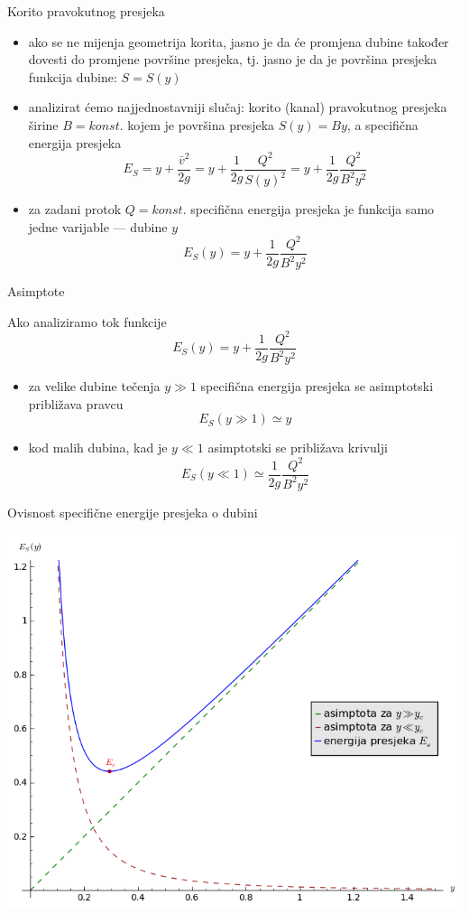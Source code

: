 \documentclass{beamer}
\begin{document}
\begin{frame}{Korito pravokutnog presjeka}

\begin{itemize}
\item ako se ne mijenja geometrija korita, jasno je da će promjena dubine
također dovesti do promjene površine presjeka, tj. jasno je da je
površina presjeka funkcija dubine: $S=S(y)$
\item analizirat ćemo najjednostavniji slučaj: korito (kanal) pravokutnog
presjeka širine $B=konst.$ kojem je površina presjeka $S(y)=By$,
a specifična energija presjeka
\[
E_{S}=y+\frac{\bar{v}^{2}}{2g}=y+\frac{1}{2g}\frac{Q^{2}}{S(y)^{2}}=y+\frac{1}{2g}\frac{Q^{2}}{B^{2}y^{2}}
\]
\item za zadani protok $Q=konst.$ specifična energija presjeka je funkcija
samo jedne varijable --- dubine $y$
\[
E_{S}(y)=y+\frac{1}{2g}\frac{Q^{2}}{B^{2}y^{2}}
\]
\end{itemize}
\end{frame}

\begin{frame}{Asimptote}

Ako analiziramo tok funkcije
\[
E_{S}(y)=y+\frac{1}{2g}\frac{Q^{2}}{B^{2}y^{2}}
\]

\begin{itemize}
\item za velike dubine tečenja $y\gg1$ specifična energija presjeka se
asimptotski približava pravcu
\[
E_{S}(y\gg1)\simeq y
\]
\item kod malih dubina, kad je $y\ll1$ asimptotski se približava krivulji
\[
E_{S}(y\ll1)\simeq\frac{1}{2g}\frac{Q^{2}}{B^{2}y^{2}}
\]
\end{itemize}
\end{frame}

\begin{frame}{Ovisnost specifične energije presjeka o dubini}

\begin{center}
\includegraphics[height=0.7\paperheight]{slike/MF-10-kriticna-energija}
\par\end{center}

\end{frame}
\end{document}
